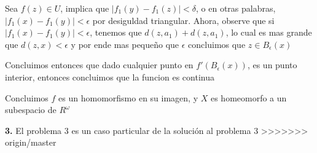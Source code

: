 \documentclass[]{article}
\newcommand{\abs}[1]{\left| #1 \right|}
\begin{document}
 Sea $ f(z) \in U $, implica que $ \abs{f_1(y) - f_1(z)} < \delta $, o en otras palabras, $ \abs{f_1(x)-f_1(y)} < \epsilon $ por desiguldad triangular. Ahora, observe que si $ \abs{f_1(x)-f_1(y)} < \epsilon  $, tenemos que $ d(z,a_1) + d(z,a_1) $, lo cual es mas grande que $ d(z,x) < \epsilon $ y por ende mas pequeño que $ \epsilon $ concluimos que $ z \in B_{\epsilon}(x) $
 
 Concluimos entonces que dado cualquier punto en $ f'(B_{\epsilon}(x)) $, es un punto interior, entonces concluimos que la funcion es continua 
 
 \qedsymbol
 
 Concluimos $f$ es un homomorfismo en su imagen, y $X$ es homeomorfo a un subespacio de $ R^\omega $
 
 \textbf{3.} El problema $ 3 $ es un caso particular de la solución al problema $3$
>>>>>>> origin/master
\end{document}
